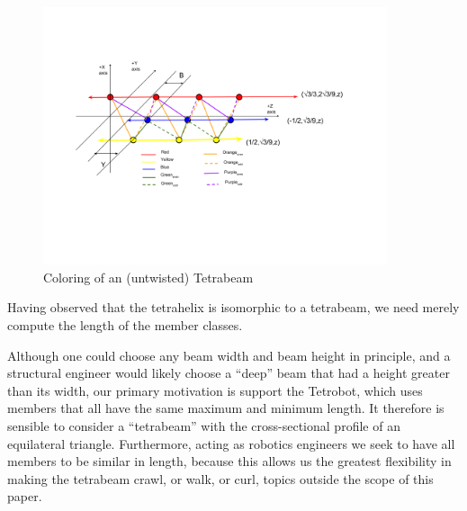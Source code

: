 \documentclass[11pt]{article}
\begin{document}
 \begin{figure}[H]
     \centering
     \includegraphics[width=0.9\textwidth]{figures/TetrahelixColoringDiagram.png}
     \caption{Coloring of an (untwisted) Tetrabeam}
 \end{figure}

 Having observed that the tetrahelix is isomorphic to a tetrabeam, we need merely compute the length of the member classes.

 Although one could choose any beam width and beam height in principle, and a structural engineer would likely choose a ``deep'' beam that had
 a height greater than its width, our primary motivation is support the Tetrobot, which uses members that all have the same maximum and
 minimum length. It therefore is sensible to consider a ``tetrabeam'' with the cross-sectional profile of an equilateral triangle.
 Furthermore, acting as robotics engineers we seek to have all members to be similar in length, because this allows us the greatest
 flexibility in making the tetrabeam crawl, or walk, or curl, topics outside the scope of this paper.
\end{document}
